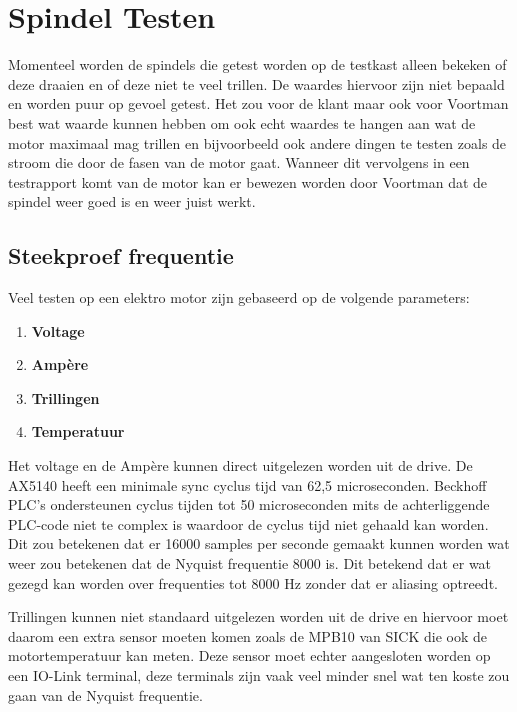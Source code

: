\section{Spindel Testen}

Momenteel worden de spindels die getest worden op de testkast alleen bekeken of deze draaien en of deze niet te veel trillen. De waardes hiervoor zijn niet bepaald en worden puur op gevoel getest. Het zou voor de klant maar ook voor Voortman best wat waarde kunnen hebben om ook echt waardes te hangen aan wat de motor maximaal mag trillen en bijvoorbeeld ook andere dingen te testen zoals de stroom die door de fasen van de motor gaat. Wanneer dit vervolgens in een testrapport komt van de motor kan er bewezen worden door Voortman dat de spindel weer goed is en weer juist werkt.

\subsection{Steekproef frequentie}

Veel testen op een elektro motor zijn gebaseerd op de volgende parameters:

\begin{enumerate}
	\item \textbf{Voltage}
	\item \textbf{Ampère}
	\item \textbf{Trillingen}
	\item \textbf{Temperatuur}
\end{enumerate}

Het voltage en de Ampère kunnen direct uitgelezen worden uit de drive. De \gls{AX5140} heeft een minimale sync cyclus tijd van 62,5 microseconden. Beckhoff \gls{PLC}’s ondersteunen cyclus tijden tot 50 microseconden mits de achterliggende \gls{PLC}-code niet te complex is waardoor de cyclus tijd niet gehaald kan worden. Dit zou betekenen dat er 16000 samples per seconde gemaakt kunnen worden wat weer zou betekenen dat de Nyquist frequentie 8000 is. Dit betekend dat er wat gezegd kan worden over frequenties tot 8000 Hz zonder dat er aliasing optreedt.

\vspace{0.5cm}

Trillingen kunnen niet standaard uitgelezen worden uit de drive en hiervoor moet daarom een extra sensor moeten komen zoals de MPB10 van SICK die ook de motortemperatuur kan meten. Deze sensor moet echter aangesloten worden op een IO-Link terminal, deze terminals zijn vaak veel minder snel wat ten koste zou gaan van de Nyquist frequentie.

